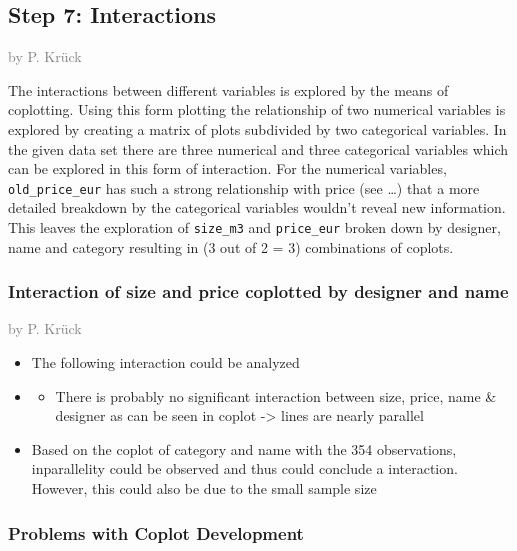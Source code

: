 \documentclass[a4paper, nobind]{templates/ociamthesis}
\providecommand{\tightlist}{%
  \setlength{\itemsep}{0pt}\setlength{\parskip}{0pt}}
\begin{document}
\hypertarget{step-7-interactions}{%
\subsection{Step 7: Interactions}\label{step-7-interactions}}

\textcolor{gray}{by P. Krück}

The interactions between different variables is explored by the means of coplotting.
Using this form plotting the relationship of two numerical variables is explored by creating a matrix of plots subdivided by two categorical variables.
In the given data set there are three numerical and three categorical variables which can be explored in this form of interaction. For the numerical variables, \texttt{old\_price\_eur} has such a strong relationship with price (see \ldots{}) that a more detailed breakdown by the categorical variables wouldn't reveal new information. This leaves the exploration of \texttt{size\_m3} and \texttt{price\_eur} broken down by designer, name and category resulting in (3 out of 2 = 3) combinations of coplots.

\hypertarget{interaction-of-size-and-price-coplotted-by-designer-and-name}{%
\subsubsection{Interaction of size and price coplotted by designer and name}\label{interaction-of-size-and-price-coplotted-by-designer-and-name}}

\textcolor{gray}{by P. Krück}

\begin{itemize}
\item
  The following interaction could be analyzed
\item
  \begin{itemize}
  \tightlist
  \item
    There is probably no significant interaction between size, price, name \& designer as can be seen in coplot -\textgreater{} lines are nearly parallel
  \end{itemize}
\item
  Based on the coplot of category and name with the 354 observations, inparallelity could be observed and thus could conclude a interaction. However, this could also be due to the small sample size
\end{itemize}

\hypertarget{problems-with-coplot-development}{%
\subsubsection{Problems with Coplot Development}\label{problems-with-coplot-development}}
\end{document}
